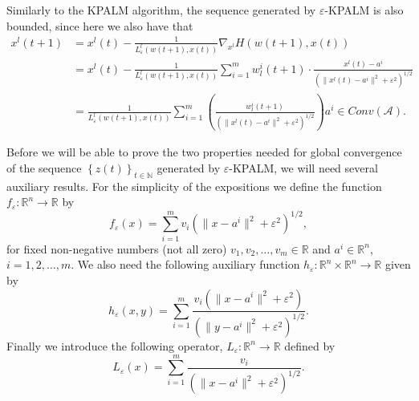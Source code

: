 \documentclass[11pt]{article}
\numberwithin{equation}{section}
\begin{document}
Similarly to the KPALM algorithm, the sequence generated by $\varepsilon$-KPALM is also bounded, since here we also have that
\begin{align*}
	x^l(t+1) &= x^l(t) - \frac{1}{L^l_{\varepsilon}(w(t+1),x(t))} \nabla_{x^l} H(w(t+1),x(t)) \\
	&= x^l(t) - \frac{1}{L^l_{\varepsilon}(w(t+1),x(t))} \sum\limits_{i=1}^{m} w^i_l(t+1) \cdot \frac{x^l(t) - a^i}{\left( \|x^l(t) - a^i\|^2 + {\varepsilon}^2 \right)^{1/2}} \\
	&= \frac{1}{L^l_{\varepsilon}(w(t+1),x(t))} \sum\limits_{i=1}^{m} \left( \frac{w^i_l(t+1)}{\left( \|x^l(t) - a^i\|^2 + {\varepsilon}^2 \right)^{1/2}} \right) a^i \in Conv(\mathcal{A}).
\end{align*}

Before we will be able to prove the two properties needed for global convergence of the sequence $\left\lbrace z(t) \right\rbrace_{t \in \mathbb{N}}$ generated by $\varepsilon$-KPALM, we will need several auxiliary results. For the simplicity of the expositions we define the  function $f_{\varepsilon}: \mathbb{R}^n \rightarrow \mathbb{R}$ by
\begin{equation*}
	f_{\varepsilon}(x) = \sum\limits_{i=1}^{m} v_i \left( \|x - a^i\|^2 + {\varepsilon}^2 \right)^{1/2},
\end{equation*}
for fixed non-negative numbers (not all zero) $v_1,v_2, \ldots, v_m \in \mathbb{R}$ and $a^i \in \mathbb{R}^n$, $i=1,2, \ldots, m$. We also need the following auxiliary function $h_{\varepsilon}: \mathbb{R}^n \times \mathbb{R}^n \rightarrow \mathbb{R}$ given by
\begin{equation*}
	h_{\varepsilon}(x,y) = \sum\limits_{i=1}^m \frac{v_i \left( \|x-a^i\|^2 + {\varepsilon}^2 \right)}{\left( \|y-a^i\|^2 + {\varepsilon}^2 \right)^{1/2}} .
\end{equation*}
Finally we introduce the following operator, $L_{\varepsilon}: \mathbb{R}^n \rightarrow \mathbb{R}$ defined by
\begin{equation*}
	L_{\varepsilon}(x) = \sum\limits_{i=1}^{m}\frac{v_i}{\left( \|x - a^i\|^2 + {\varepsilon}^2 \right)^{1/2}} .
\end{equation*}
\end{document}
